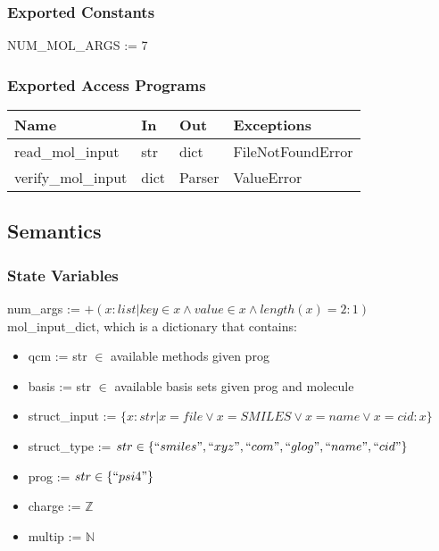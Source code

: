 \documentclass[12pt, titlepage]{article}
\begin{document}
\subsubsection{Exported Constants}

NUM\_MOL\_ARGS := 7

\subsubsection{Exported Access Programs}

\begin{table}[H]
	\begin{tabular}{p{4cm} p{2cm} p{2cm} p{5cm}}
		\toprule
		\textbf{Name} & \textbf{In} & \textbf{Out} & \textbf{Exceptions} \\
		\hline
		read\_mol\_input   & str  & dict & FileNotFoundError \\
		verify\_mol\_input & dict & Parser & ValueError \\
		\bottomrule
	\end{tabular}
\end{table}

\subsection{Semantics}

\subsubsection{State Variables}

\noindent num\_args := $+(x : list | key \in x \land value \in x \land 
length(x) = 2 : 1)$ \\

\noindent mol\_input\_dict, which is a dictionary that contains:
\begin{itemize}
	\item qcm := str $\in$ available methods given prog
	\item basis := str $\in$ available basis sets given prog and molecule
	\item struct\_input := $\{x : str | x = file \lor x = SMILES \lor x = name 
	\lor x = cid : x\}$
	\item struct\_type := $str \in \{``smiles", ``xyz", ``com", ``glog", 
	``name", ``cid"\} $
	\item prog := $str \in \{``psi4"\}$
	\item charge := $\mathbb{Z}$
	\item multip := $\mathbb{N}$
\end{itemize}
\end{document}
